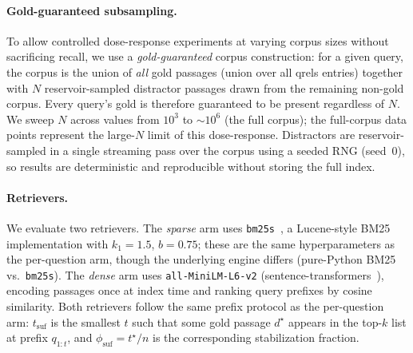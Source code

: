 \documentclass[11pt]{article}
\renewcommand{\cite}{\citep}                         %
\begin{document}
\paragraph{Gold-guaranteed subsampling.} To allow controlled dose-response
experiments at varying corpus sizes without sacrificing recall, we use a
\emph{gold-guaranteed} corpus construction: for a given query, the corpus is the
union of \emph{all} gold passages (union over all qrels entries) together with $N$
reservoir-sampled distractor passages drawn from the remaining non-gold corpus.
Every query's gold is therefore guaranteed to be present regardless of $N$.
We sweep $N$ across values from $10^3$ to $\sim10^6$ (the full corpus); the
full-corpus data points represent the large-$N$ limit of this dose-response.
Distractors are reservoir-sampled in a single streaming pass over the corpus using
a seeded RNG (seed~0), so results are deterministic and reproducible without
storing the full index.

\paragraph{Retrievers.} We evaluate two retrievers. The \emph{sparse} arm uses
\texttt{bm25s}~\cite{lassance2024bm25s}, a Lucene-style BM25 implementation with
$k_1{=}1.5$, $b{=}0.75$; these are the same hyperparameters as the per-question
arm, though the underlying engine differs (pure-Python BM25 vs.\ \texttt{bm25s}).
The \emph{dense} arm uses \texttt{all-MiniLM-L6-v2}
(sentence-transformers~\cite{reimers2019sentence}), encoding passages once at
index time and ranking query prefixes by cosine similarity. Both retrievers follow
the same prefix protocol as the per-question arm: $t_{\mathrm{suf}}$ is the
smallest $t$ such that some gold passage $d^\star$ appears in the top-$k$ list
at prefix $q_{1:t}$, and $\phi_{\mathrm{suf}} = t^\star / n$ is the corresponding
stabilization fraction.


\end{document}
